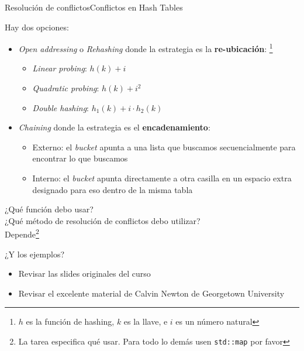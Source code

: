 \documentclass[spanish, c]{beamer}
\newcommand\blfootnote[1]{%
\begingroup
\renewcommand\thefootnote{}\footnote{#1}%
\addtocounter{footnote}{-1}%
\endgroup
}
\begin{document}
\begin{frame}{Resolución de conflictos}{Conflictos en Hash Tables}

    Hay dos opciones:

    \bigskip

    \begin{itemize}
        \itemsep3ex
        \item \textit{\alert{Open addressing}} o \textit{Rehashing} donde la estrategia es la \textbf{re-ubicación}:
        \blfootnote{\scriptsize $h$ es la función de hashing, $k$ es la llave, e $i$ es un número natural}
        \begin{itemize}
            \item \textit{Linear probing}: \quad $h(k) + i$
            \item \textit{Quadratic probing}: \quad $h(k) + i^2$
            \item \textit{Double hashing}: \quad $h_1(k) + i \cdot h_2(k)$
        \end{itemize}
        \item \textit{\alert{Chaining}} donde la estrategia es el \textbf{encadenamiento}:
        \begin{itemize}
            \item Externo: el \textit{bucket} apunta a una lista que buscamos secuencialmente para encontrar lo que buscamos
            \item Interno: el \textit{bucket} apunta directamente a otra casilla en un espacio extra designado para eso dentro de la misma tabla
        \end{itemize}
    \end{itemize}

\end{frame}

\begin{frame}
    \begin{center}
        \LARGE
        ¿Qué función debo usar?\\
        ¿Qué método de resolución de conflictos debo utilizar?\\[7ex]
        Depende\footnote{La tarea especifica qué usar. Para todo lo demás usen \texttt{std::map} {\tiny por favor}}
    \end{center}

    \begin{center}
        ¿Y los ejemplos?
    \end{center}

    \begin{itemize}
        \item Revisar las slides originales del curso
        \item Revisar el excelente material de Calvin Newton de Georgetown University
    \end{itemize}
    

\end{frame}



\end{document}
